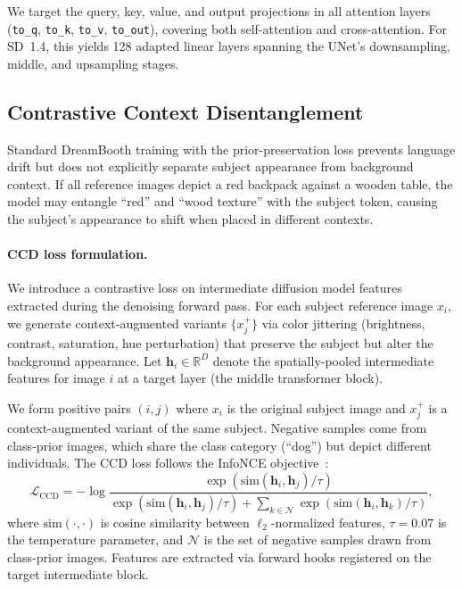 \documentclass{article}
\begin{document}
We target the query, key, value, and output projections in all attention layers (\texttt{to\_q}, \texttt{to\_k}, \texttt{to\_v}, \texttt{to\_out}), covering both self-attention and cross-attention.
For SD~1.4, this yields 128 adapted linear layers spanning the UNet's downsampling, middle, and upsampling stages.

\subsection{Contrastive Context Disentanglement}
\label{sec:ccd}

Standard DreamBooth training with the prior-preservation loss prevents language drift but does not explicitly separate subject appearance from background context.
If all reference images depict a red backpack against a wooden table, the model may entangle ``red'' and ``wood texture'' with the subject token, causing the subject's appearance to shift when placed in different contexts.

\paragraph{CCD loss formulation.}
We introduce a contrastive loss on intermediate diffusion model features extracted during the denoising forward pass.
For each subject reference image $x_i$, we generate context-augmented variants $\{x_j^+\}$ via color jittering (brightness, contrast, saturation, hue perturbation) that preserve the subject but alter the background appearance.
Let $\mathbf{h}_i \in \mathbb{R}^D$ denote the spatially-pooled intermediate features for image $i$ at a target layer (the middle transformer block).

We form positive pairs $(i, j)$ where $x_i$ is the original subject image and $x_j^+$ is a context-augmented variant of the same subject.
Negative samples come from class-prior images, which share the class category (``dog'') but depict different individuals.
The CCD loss follows the InfoNCE objective~\citep{oord2018infonce}:
\begin{equation}
    \mathcal{L}_{\text{CCD}} = -\log \frac{\exp(\text{sim}(\mathbf{h}_i, \mathbf{h}_j) / \tau)}{\exp(\text{sim}(\mathbf{h}_i, \mathbf{h}_j) / \tau) + \sum_{k \in \mathcal{N}} \exp(\text{sim}(\mathbf{h}_i, \mathbf{h}_k) / \tau)},
    \label{eq:ccd}
\end{equation}
where $\text{sim}(\cdot, \cdot)$ is cosine similarity between $\ell_2$-normalized features, $\tau = 0.07$ is the temperature parameter, and $\mathcal{N}$ is the set of negative samples drawn from class-prior images.
Features are extracted via forward hooks registered on the target intermediate block.
\end{document}
